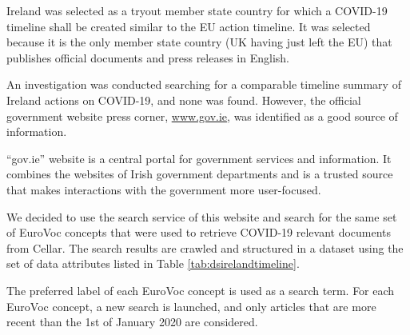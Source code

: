 Ireland was selected as a tryout member state country for which a COVID-19 timeline shall be created similar to the EU action timeline. It was selected because it is the only member state country (UK having just left the EU) that publishes official documents and press releases in English. 

An investigation was conducted searching for a comparable timeline summary of Ireland actions on COVID-19, and none was found. However, the official government website press corner, \href{http://www.gov.ie}{\textcolor[HTML]{1155CC}{\ul{www.gov.ie}}}, was identified as a good source of information. 

``gov.ie''  website is a central portal for government services and information. It combines the websites of Irish government departments and is a trusted source that makes interactions with the government more user-focused.

We decided to use the search service of this website and search for the same set of EuroVoc concepts that were used to retrieve COVID-19 relevant documents from Cellar. The search results are crawled and structured in a dataset using the set of data attributes listed in  Table \ref{tab:dsirelandtimeline}. 

The preferred label of each EuroVoc concept is used as a search term. For each EuroVoc concept, a new search is launched, and only articles that are more recent than the 1st of January 2020 are considered.

